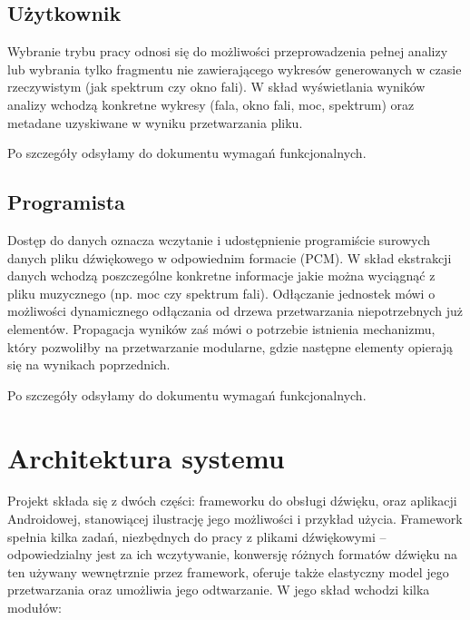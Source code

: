 \section{Użytkownik}
Wybranie trybu pracy odnosi się do możliwości przeprowadzenia pełnej analizy lub wybrania tylko fragmentu nie zawierającego wykresów generowanych w czasie rzeczywistym (jak spektrum czy okno fali).
W skład wyświetlania wyników analizy wchodzą konkretne wykresy (fala, okno fali, moc, spektrum) oraz metadane uzyskiwane w wyniku przetwarzania pliku.

Po szczegóły odsyłamy do dokumentu wymagań funkcjonalnych.

\section{Programista}
Dostęp do danych oznacza wczytanie i udostępnienie programiście surowych danych pliku dźwiękowego w odpowiednim formacie (PCM).
W skład ekstrakcji danych wchodzą poszczególne konkretne informacje jakie można wyciągnąć z pliku muzycznego (np. moc czy spektrum fali). Odłączanie jednostek mówi o możliwości dynamicznego odłączania od drzewa przetwarzania niepotrzebnych już elementów. Propagacja wyników zaś mówi o potrzebie istnienia mechanizmu, który pozwoliłby na przetwarzanie modularne, gdzie następne elementy opierają się na wynikach poprzednich.

Po szczegóły odsyłamy do dokumentu wymagań funkcjonalnych.


\chapter{Architektura systemu}

Projekt składa się z dwóch części: frameworku do obsługi dźwięku, oraz aplikacji Androidowej,
stanowiącej ilustrację jego możliwości i przykład użycia. Framework spełnia kilka zadań, niezbędnych
do pracy z plikami dźwiękowymi -- odpowiedzialny jest za ich wczytywanie, konwersję różnych formatów
dźwięku na ten używany wewnętrznie przez framework, oferuje także elastyczny model jego
przetwarzania oraz umożliwia jego odtwarzanie. W jego skład wchodzi kilka modułów:

